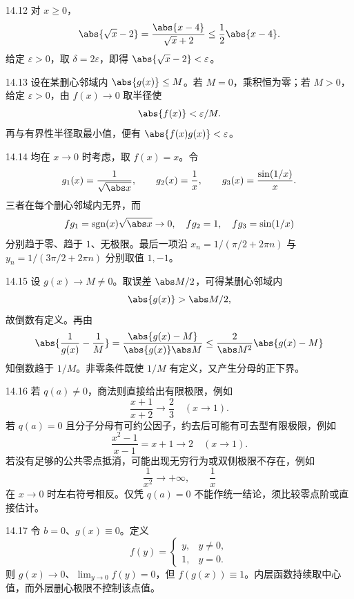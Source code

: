 \begin{solution}{14.12}
对 \(x\ge0\)，
\[
 \abs{\sqrt x-2}
 =\frac{\abs{x-4}}{\sqrt x+2}
 \le\frac12\abs{x-4}.
\]
给定 \(\varepsilon>0\)，取 \(\delta=2\varepsilon\)，即得 \(\abs{\sqrt x-2}<\varepsilon\)。
\end{solution}

\begin{solution}{14.13}
设在某删心邻域内 \(\abs{g(x)}\le M\)。若 \(M=0\)，乘积恒为零；若 \(M>0\)，给定 \(\varepsilon>0\)，由 \(f(x)\to0\) 取半径使
\[
 \abs{f(x)}<\varepsilon/M.
\]
再与有界性半径取最小值，便有 \(\abs{f(x)g(x)}<\varepsilon\)。
\end{solution}

\begin{solution}{14.14}
均在 \(x\to0\) 时考虑，取 \(f(x)=x\)。令
\[
 g_1(x)=\frac1{\sqrt{\abs x}},\qquad
 g_2(x)=\frac1x,\qquad
 g_3(x)=\frac{\sin(1/x)}x.
\]
三者在每个删心邻域内无界，而
\[
 f g_1=\operatorname{sgn}(x)\sqrt{\abs x}\to0,\quad
 f g_2=1,\quad
 f g_3=\sin(1/x)
\]
分别趋于零、趋于 \(1\)、无极限。最后一项沿 \(x_n=1/(\pi/2+2\pi n)\) 与 \(y_n=1/(3\pi/2+2\pi n)\) 分别取值 \(1,-1\)。
\end{solution}

\begin{solution}{14.15}
设 \(g(x)\to M\ne0\)。取误差 \(\abs M/2\)，可得某删心邻域内
\[
 \abs{g(x)}>\abs M/2,
\]
故倒数有定义。再由
\[
 \abs{\frac1{g(x)}-\frac1M}
 =\frac{\abs{g(x)-M}}{\abs{g(x)}\abs M}
 \le\frac2{\abs M^2}\abs{g(x)-M}
\]
知倒数趋于 \(1/M\)。非零条件既使 \(1/M\) 有定义，又产生分母的正下界。
\end{solution}

\begin{solution}{14.16}
若 \(q(a)\ne0\)，商法则直接给出有限极限，例如
\[
 \frac{x+1}{x+2}\longrightarrow\frac23\quad(x\to1).
\]
若 \(q(a)=0\) 且分子分母有可约公因子，约去后可能有可去型有限极限，例如
\[
 \frac{x^2-1}{x-1}=x+1\to2\quad(x\to1).
\]
若没有足够的公共零点抵消，可能出现无穷行为或双侧极限不存在，例如
\[
 \frac1{x^2}\to+\infty,\qquad \frac1x
\]
在 \(x\to0\) 时左右符号相反。仅凭 \(q(a)=0\) 不能作统一结论，须比较零点阶或直接估计。
\end{solution}

\begin{solution}{14.17}
令 \(b=0\)、\(g(x)\equiv0\)。定义
\[
 f(y)=
 \begin{cases}
 y,&y\ne0,\\
 1,&y=0.
 \end{cases}
\]
则 \(g(x)\to0\)、\(\lim_{y\to0}f(y)=0\)，但 \(f(g(x))\equiv1\)。内层函数持续取中心值，而外层删心极限不控制该点值。
\end{solution}

